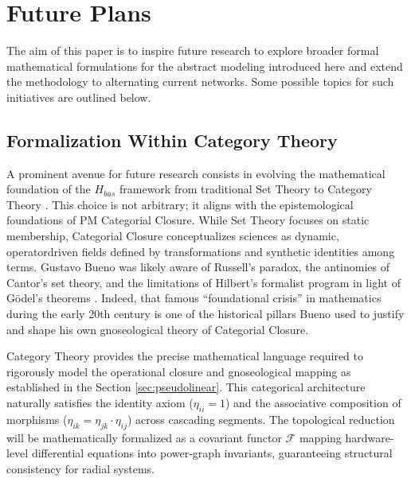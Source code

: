 \documentclass[energies,accept,oneauthor,pdftex]{Definitions/mdpi}
\begin{document}
\section{Future Plans}
\label{sec:future_plans}\label{sec:future}

The aim of this paper is to inspire future research to explore broader formal mathematical formulations for the abstract modeling introduced here and extend the methodology to alternating current networks. Some possible topics for such initiatives are outlined below.


\subsection{Formalization Within Category Theory}
\label{sec:formalcath}

A prominent avenue for future research consists in evolving the mathematical foundation of the $H_{bus}$ framework from traditional Set Theory to Category Theory \cite{maclane1998categories}. This choice is not arbitrary; it aligns with the epistemological foundations of PM Categorial Closure. While Set Theory focuses on static membership, Categorial Closure conceptualizes sciences as dynamic, operatordriven fields defined by transformations and synthetic identities among terms.  Gustavo Bueno was likely aware of Russell's paradox, the antinomies of Cantor's set theory, and the limitations of Hilbert's formalist program in light of Gödel's theorems \cite{godel1931}. Indeed, that famous ``foundational crisis'' in mathematics during the early 20th century is one of the historical pillars Bueno used to justify and shape his own gnoseological theory of Categorial Closure.


Category Theory provides the precise mathematical language required to rigorously model the operational closure and gnoseological mapping as established in the Section \ref{sec:pseudolinear}. This categorical architecture naturally satisfies the identity axiom ($\eta_{ii} = 1$) and the associative composition of morphisms ($\eta_{ik} = \eta_{jk} \cdot \eta_{ij}$) across cascading segments. The topological reduction will be mathematically formalized as a covariant functor $\mathscr{F}$ mapping hardware-level differential equations into power-graph invariants, guaranteeing structural consistency for radial systems.
\end{document}
